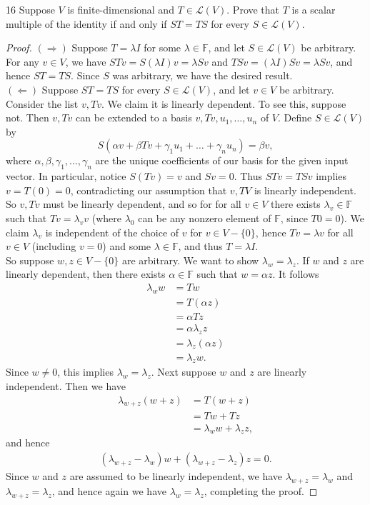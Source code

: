 \documentclass{extarticle}
\newenvironment{problem}[1]{\begin{prob*}{#1}{}}{\end{prob*}}
\newcommand{\F}{\mathbb{F}}
\newcommand{\Hom}{\mathcal{L}}
\begin{document}
\begin{problem}{16}
Suppose $V$ is finite-dimensional and $T\in\Hom(V)$.  Prove that $T$ is a scalar multiple of the identity if and only if $ST = TS$ for every $S\in\Hom(V)$.
\end{problem}
\begin{proof}
$(\Rightarrow)$ Suppose $T = \lambda I$ for some $\lambda\in\F$, and let $S\in\Hom(V)$ be arbitrary.  For any $v\in V$, we have $STv=S(\lambda I)v =\lambda Sv$ and $TSv = (\lambda I)Sv = \lambda Sv$, and hence $ST = TS$.  Since $S$ was arbitrary, we have the desired result.\\
\indent $(\Leftarrow)$ Suppose $ST = TS$ for every $S\in\Hom(V)$, and let $v\in V$ be arbitrary.  Consider the list $v, Tv$.  We claim it is linearly dependent.  To see this, suppose not.  Then $v, Tv$ can be extended to a basis $v, Tv, u_1,\dots,u_n$ of $V$.  Define $S\in\Hom(V)$ by
\begin{equation*}
S(\alpha v + \beta Tv + \gamma_1u_1 + \dots + \gamma_nu_n) = \beta v,
\end{equation*}
where $\alpha, \beta,\gamma_1,\dots,\gamma_n$ are the unique coefficients of our basis for the given input vector.  In particular, notice $S(Tv) = v$ and $Sv = 0$.  Thus $STv = TSv$ implies $v = T(0) = 0$, contradicting our assumption that $v, TV$ is linearly independent.  So $v, Tv$ must be linearly dependent, and so for for all $v\in V$ there exists $\lambda_v\in\F$ such that $Tv = \lambda_v v$ (where $\lambda_0$ can be any nonzero element of $\F$, since $T0 = 0$).  We claim $\lambda_v$ is independent of the choice of $v$ for $v\in V-\{0\}$, hence $Tv = \lambda v$ for all $v\in V$ (including $v = 0$) and some $\lambda \in \F$, and thus $T = \lambda I$.\\
\indent So suppose $w,z\in V-\{0\}$ are arbitrary.  We want to show $\lambda_w = \lambda_z$.  If $w$ and $z$ are linearly dependent, then there exists $\alpha\in\F$ such that $w=\alpha z$.  It follows
\begin{align*}
\lambda_w w &= Tw\\
&= T(\alpha z)\\
&= \alpha Tz \\
&= \alpha \lambda_z z\\
&= \lambda_z (\alpha z)\\
&= \lambda_z w.
\end{align*}
Since $w\neq 0$, this implies $\lambda_w = \lambda_z$.  Next suppose $w$ and $z$ are linearly independent.  Then we have
\begin{align*}
\lambda_{w + z} (w + z)&= T(w + z)\\
&= Tw + Tz\\
&= \lambda_w w + \lambda_z z,
\end{align*}
and hence
\begin{align*}
(\lambda_{w + z} - \lambda_w)w + (\lambda_{w + z} - \lambda_z)z = 0.
\end{align*}
Since $w$ and $z$ are assumed to be linearly independent, we have $\lambda_{w + z} = \lambda_w$ and $\lambda_{w + z} = \lambda_z$, and hence again we have $\lambda_w = \lambda_z$, completing the proof.
\end{proof}
\end{document}

